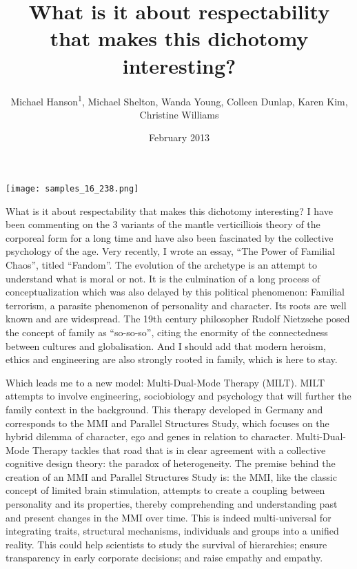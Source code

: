 \documentclass{article}
\title{What is it about respectability that makes this dichotomy interesting?}
\author{Michael Hanson\textsuperscript{1},  Michael Shelton,  Wanda Young,  Colleen Dunlap,  Karen Kim,  Christine Williams}
\affil{\textsuperscript{1}Weill Cornell Medical College}
\date{February 2013}
\begin{document}
\maketitle

\begin{center}
\begin{minipage}{0.75\linewidth}
\texttt{[image: samples\_16\_238.png]}
\end{minipage}
\end{center}

What is it about respectability that makes this dichotomy interesting? I have been commenting on the 3 variants of the mantle verticilliois theory of the corporeal form for a long time and have also been fascinated by the collective psychology of the age. Very recently, I wrote an essay, “The Power of Familial Chaos”, titled “Fandom”. The evolution of the archetype is an attempt to understand what is moral or not. It is the culmination of a long process of conceptualization which was also delayed by this political phenomenon: Familial terrorism, a parasite phenomenon of personality and character. Its roots are well known and are widespread. The 19th century philosopher Rudolf Nietzsche posed the concept of family as “so-so-so”, citing the enormity of the connectedness between cultures and globalisation. And I should add that modern heroism, ethics and engineering are also strongly rooted in family, which is here to stay.

Which leads me to a new model: Multi-Dual-Mode Therapy (MILT). MILT attempts to involve engineering, sociobiology and psychology that will further the family context in the background. This therapy developed in Germany and corresponds to the MMI and Parallel Structures Study, which focuses on the hybrid dilemma of character, ego and genes in relation to character. Multi-Dual-Mode Therapy tackles that road that is in clear agreement with a collective cognitive design theory: the paradox of heterogeneity. The premise behind the creation of an MMI and Parallel Structures Study is: the MMI, like the classic concept of limited brain stimulation, attempts to create a coupling between personality and its properties, thereby comprehending and understanding past and present changes in the MMI over time. This is indeed multi-universal for integrating traits, structural mechanisms, individuals and groups into a unified reality. This could help scientists to study the survival of hierarchies; ensure transparency in early corporate decisions; and raise empathy and empathy.
\end{document}
